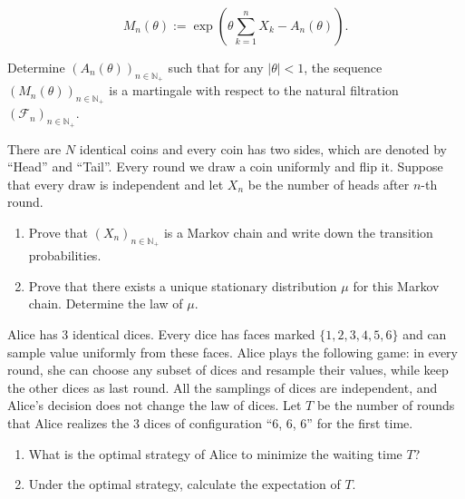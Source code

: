 \documentclass[11pt,a4paper]{article}
\newcommand{\examstatement}[1]{%
  \par\addvspace{0.85em}%
  \noindent{\bfseries #1}\par\nobreak\addvspace{0.28em}%
}
\begin{document}
\[
M_n(\theta) := \exp\left( \theta \sum_{k=1}^n X_k - A_n(\theta) \right).
\]

Determine \( (A_n(\theta))_{n \in \mathbb{N}_+} \) such that for any \( |\theta| < 1 \), the sequence \( (M_n(\theta))_{n \in \mathbb{N}_+} \) is a martingale with respect to the natural filtration \( (\mathcal{F}_n)_{n \in \mathbb{N}_+} \).

\examstatement{Problem 3. [10 pts.]}
There are \( N \) identical coins and every coin has two sides, which are denoted by ``Head'' and ``Tail''. Every round we draw a coin uniformly and flip it. Suppose that every draw is independent and let \( X_n \) be the number of heads after \( n \)-th round.
\begin{enumerate}[label=(\alph*)]
    \item Prove that \( (X_n)_{n \in \mathbb{N}_+} \) is a Markov chain and write down the transition probabilities.
    \item Prove that there exists a unique stationary distribution \( \mu \) for this Markov chain. Determine the law of \( \mu \).
\end{enumerate}

\examstatement{Problem 4. [10 pts.]}
Alice has 3 identical dices. Every dice has faces marked \( \{1, 2, 3, 4, 5, 6\} \) and can sample value uniformly from these faces. Alice plays the following game: in every round, she can choose any subset of dices and resample their values, while keep the other dices as last round. All the samplings of dices are independent, and Alice's decision does not change the law of dices. Let \( T \) be the number of rounds that Alice realizes the 3 dices of configuration ``6, 6, 6'' for the first time.
\begin{enumerate}[label=(\alph*)]
    \item What is the optimal strategy of Alice to minimize the waiting time \( T \)?
    \item Under the optimal strategy, calculate the expectation of \( T \).
\end{enumerate}
\end{document}
